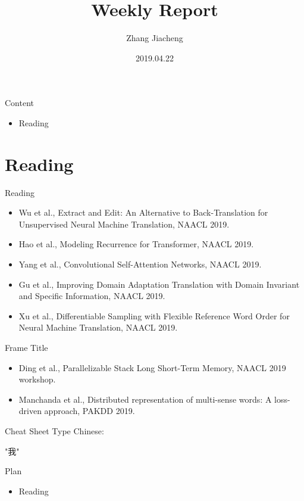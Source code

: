 \documentclass{beamer}
\title[Your Short Title]{Weekly Report}
\author{Zhang Jiacheng}
\date{2019.04.22}
\begin{document}
\begin{frame}
  \titlepage
\end{frame}

\begin{frame}{Content}
    \begin{itemize}
        \item Reading
    \end{itemize}
\end{frame}

\section{Reading}

\begin{frame}{Reading}
\begin{itemize}
  \item Wu et al., Extract and Edit: An Alternative to Back-Translation for Unsupervised Neural Machine Translation, NAACL 2019.
  \item Hao et al., Modeling Recurrence for Transformer, NAACL 2019.
  \item Yang et al., Convolutional Self-Attention Networks, NAACL 2019.
  \item Gu et al., Improving Domain Adaptation Translation with Domain Invariant and Specific Information, NAACL 2019.
  \item Xu et al., Differentiable Sampling with Flexible Reference Word Order for Neural Machine Translation, NAACL 2019.
\end{itemize}
\end{frame}

\begin{frame}{Frame Title}
\begin{itemize}
    \item Ding et al., Parallelizable Stack Long Short-Term Memory, NAACL 2019 workshop.
    \item Manchanda et al., Distributed representation of multi-sense words: A loss-driven approach, PAKDD 2019.
\end{itemize}    
\end{frame}



\begin{frame}{Cheat Sheet}
Type Chinese:
\begin{CJK*}{UTF8}{gbsn}
"我"
\end{CJK*}
\end{frame}


\begin{frame}{Plan}
\begin{itemize}
    \item Reading
\end{itemize}
\end{frame}
\end{document}
